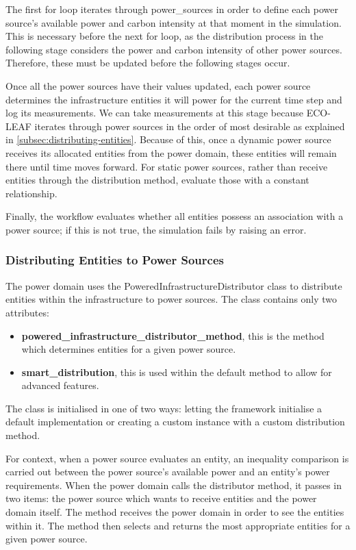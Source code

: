 \documentclass{l4proj}
\begin{document}
The first for loop iterates through power\_sources in order to define each power source's available power and carbon intensity at that moment in the simulation.
This is necessary before the next for loop, as the distribution process in the following stage considers the power and carbon intensity of other power sources. Therefore, these must be updated before the following stages occur.

Once all the power sources have their values updated, each power source determines the infrastructure entities it will power for the current time step and log its measurements.
We can take measurements at this stage because ECO-LEAF iterates through power sources in the order of most desirable as explained in \ref{subsec:distributing-entities}.
Because of this, once a dynamic power source receives its allocated entities from the power domain, these entities will remain there until time moves forward.
For static power sources, rather than receive entities through the distribution method, evaluate those with a constant relationship.

Finally, the workflow evaluates whether all entities possess an association with a power source; if this is not true, the simulation fails by raising an error.
\subsubsection{Distributing Entities to Power Sources}\label{imp:subsec:distributor}
The power domain uses the PoweredInfrastructureDistributor class to distribute entities within the infrastructure to power sources.
The class contains only two attributes:
\begin{itemize}
    \item \textbf{powered\_infrastructure\_distributor\_method}, this is the method which determines entities for a given power source.
    \item \textbf{smart\_distribution}, this is used within the default method to allow for advanced features.
\end{itemize}
The class is initialised in one of two ways: letting the framework initialise a default implementation or creating a custom instance with a custom distribution method.

For context, when a power source evaluates an entity, an inequality comparison is carried out between the power source's available power and an entity's power requirements.
When the power domain calls the distributor method, it passes in two items: the power source which wants to receive entities and the power domain itself.
The method receives the power domain in order to see the entities within it.
The method then selects and returns the most appropriate entities for a given power source.
\end{document}
